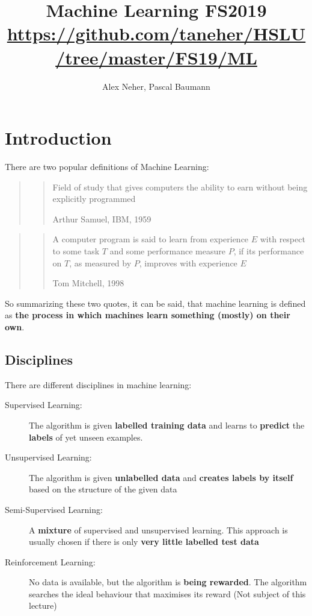 \documentclass[11pt]{article}
\begin{document}
\title{Machine Learning FS2019\\[0.2em]\normalsize{\url{https://github.com/taneher/HSLU/tree/master/FS19/ML}}}
\author{Alex Neher, Pascal Baumann}
\maketitle

\tableofcontents

\newpage
\graphicspath{{./Pictures/}}

\section{Introduction}

There are two popular definitions of Machine Learning:

\begin{centering}
    \begin{quote}
        \blockquote[Arthur Samuel, IBM, 1959]{Field of study that gives computers the ability to earn without being explicitly programmed}
    \end{quote}

    \begin{quote}
        \blockquote[Tom Mitchell, 1998]{A computer program is said to learn from experience $E$ with respect to some task $T$ and some performance measure $P$, if its performance on $T$, as measured by $P$, improves with experience $E$}
    \end{quote}
\end{centering}

So summarizing these two quotes, it can be said, that machine learning is defined as \textbf{the process in which machines learn something (mostly) on their own}.

\subsection{Disciplines}

There are different disciplines in machine learning:

\begin{description}
    \item[Supervised Learning: ] The algorithm is given \textbf{labelled training data} and learns to \textbf{predict} the \textbf{labels} of yet unseen examples.
    \item[Unsupervised Learning: ] The algorithm is given \textbf{unlabelled data} and \textbf{creates labels by itself} based on the structure of the given data
    \item[Semi-Supervised Learning: ] A \textbf{mixture} of supervised and unsupervised learning. This approach is usually chosen if there is only \textbf{very little labelled test data}
    \item[Reinforcement Learning: ] No data is available, but the algorithm is \textbf{being rewarded}. The algorithm searches the ideal behaviour that maximises its reward (Not subject of this lecture)
\end{description}
\end{document}
